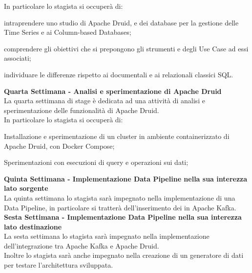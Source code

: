 In particolare lo stagista si occuperà di:
\begin{list}{*}{}
    \item intraprendere uno studio di Apache Druid, e dei database per la gestione delle Time Series e ai Column-based
    Databases;
    \item comprendere gli obiettivi che si prepongono gli strumenti e degli Use Case ad essi associati;
    \item individuare le differenze rispetto ai documentali e ai relazionali classici SQL.
\end{list}

\noindent \textbf{Quarta Settimana - Analisi e sperimentazione di Apache Druid}\\
La quarta settimana di stage è dedicata ad una attività di analisi e sperimentazione delle funzionalità di Apache Druid. \\
In particolare lo stagista si occuperà di:
\begin{list}{*}{}
    \item Installazione e sperimentazione di un cluster in ambiente containerizzato di Apache Druid, con Docker Compose;
    \item Sperimentazioni con esecuzioni di query e operazioni sui dati;
\end{list}

\noindent  \textbf{Quinta Settimana - Implementazione Data Pipeline nella sua interezza lato sorgente}\\
La quinta settimana lo stagista sarà impegnato  nella implementazione di una \gls{Data Pipeline}{}, in particolare si tratterà 
dell'inserimento dei in Apache Kafka. \\

\noindent  \textbf{Sesta Settimana - Implementazione Data Pipeline nella sua interezza lato destinazione}\\
La sesta settimana lo stagista sarà impegnato nella implementazione dell'integrazione tra Apache Kafka e Apache Druid. \\
Inoltre lo stagista sarà anche impegnato nella creazione di un generatore di dati per testare l'architettura sviluppata. \\
\pagebreak


